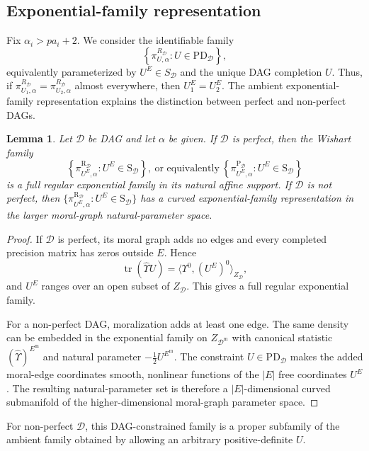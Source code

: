 \documentclass[12pt]{article}
\DeclareMathOperator{\tr}{tr}
\newcommand{\D}{\mathcal{D}}
\theoremstyle{plain}
\newtheorem{lemma}[theorem]{Lemma}
\theoremstyle{definition}
\theoremstyle{remark}
\begin{document}
\subsection*{Exponential-family representation}\label{sub:curved}
Fix \(\alpha_i>pa_i+2\).  We consider the identifiable family
\[
\left\{\pi_{U,\alpha}^{R_{\D}}:U\in\mathrm{PD}_{\D}\right\},
\]
equivalently parameterized by \(U^E\in S_{\D}\) and the unique DAG
completion \(U\).  Thus, if
\(\pi_{U_1,\alpha}^{R_{\D}}=\pi_{U_2,\alpha}^{R_{\D}}\) almost
everywhere, then \(U_1^E=U_2^E\).  The ambient exponential-family
representation explains the distinction between perfect and
non-perfect DAGs.

\begin{lemma}\label{lem:exp_RG}
 Let $\D$ be DAG and let $\alpha$ be given. If $\D$ is perfect, then the Wishart family
\[ \left\{\pi^{\mathrm{R}_{\D}}_{U^{E},\alpha}: U^{E}\in \mathrm{S}_{\D}\right\}, \: \text{or equivalently} \:   \left\{\pi^{\mathrm{P}_{\D}}_{U^{E},\alpha}: U^{E}\in \mathrm{S}_{\D}\right\}
\]
 is a full regular exponential family in its natural affine support.
 If $\D$ is not perfect, then
 \(\{\pi^{\mathrm{R}_{\D}}_{U^{E},\alpha}:U^{E}\in
 \mathrm{S}_{\D}\}\) has a curved exponential-family representation in
 the larger moral-graph natural-parameter space.
 \end{lemma}
 \begin{proof}
If \(\D\) is perfect, its moral graph adds no edges and every completed
precision matrix has zeros outside \(E\).  Hence
\[
\tr(\widehat\Upsilon U)
=\langle\Upsilon^0,(U^E)^0\rangle_{Z_{\D}},
\]
and \(U^E\) ranges over an open subset of \(Z_{\D}\).  This gives a
full regular exponential family.

For a non-perfect DAG, moralization adds at least one edge.  The same
density can be embedded in the exponential family on
\(Z_{\D^{\mathrm m}}\) with canonical statistic
\((\widehat\Upsilon)^{E^{\mathrm m}}\) and natural parameter
\(-\tfrac12U^{E^{\mathrm m}}\).  The constraint
\(U\in\mathrm{PD}_{\D}\) makes the added moral-edge coordinates smooth,
nonlinear functions of the \(|E|\) free coordinates \(U^E\).  The
resulting natural-parameter set is therefore a \(|E|\)-dimensional
curved submanifold of the higher-dimensional moral-graph parameter
space.
\end{proof}

For non-perfect \(\D\), this DAG-constrained family is a proper
subfamily of the ambient family obtained by allowing an arbitrary
positive-definite \(U\).
\end{document}
